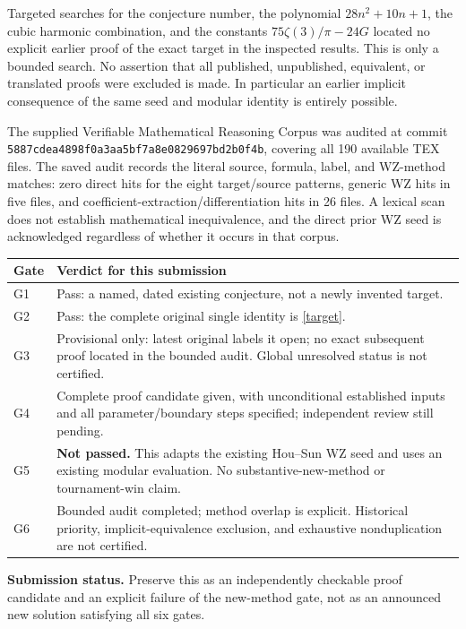 \documentclass[11pt,a4paper]{article}
\begin{document}
Targeted searches for the conjecture number, the polynomial
$28n^2+10n+1$, the cubic harmonic combination, and the constants
$75\zeta(3)/\pi-24G$ located no explicit earlier proof of the exact target
in the inspected results. This is only a bounded search. No assertion
that all published, unpublished, equivalent, or translated proofs were
excluded is made. In particular an earlier implicit consequence of the
same seed and modular identity is entirely possible.

The supplied Verifiable Mathematical Reasoning Corpus was audited at
commit \texttt{5887cdea4898f0a3aa5bf7a8e0829697bd2b0f4b}, covering all
190 available TEX files. The saved audit records the literal source,
formula, label, and WZ-method matches: zero direct hits for the eight target/source
patterns, generic WZ hits in five files, and coefficient-extraction/differentiation
hits in 26 files. A lexical scan does not establish
mathematical inequivalence, and the direct prior WZ seed is acknowledged
regardless of whether it occurs in that corpus.

\begin{center}\small
\begin{tabular}{p{.08\linewidth}p{.83\linewidth}}
\toprule
Gate&Verdict for this submission\\\midrule
G1&Pass: a named, dated existing conjecture, not a newly invented target.\\
G2&Pass: the complete original single identity is \eqref{target}.\\
G3&Provisional only: latest original labels it open; no exact subsequent proof
located in the bounded audit. Global unresolved status is not certified.\\
G4&Complete proof candidate given, with unconditional established inputs and
all parameter/boundary steps specified; independent review still pending.\\
G5&\textbf{Not passed.} This adapts the existing Hou--Sun WZ seed and uses an
existing modular evaluation. No substantive-new-method or tournament-win claim.\\
G6&Bounded audit completed; method overlap is explicit. Historical priority,
implicit-equivalence exclusion, and exhaustive nonduplication are not certified.\\
\bottomrule
\end{tabular}
\end{center}
\noindent\textbf{Submission status.} Preserve this as an independently
checkable proof candidate and an explicit failure of the new-method gate,
not as an announced new solution satisfying all six gates.
\end{document}
